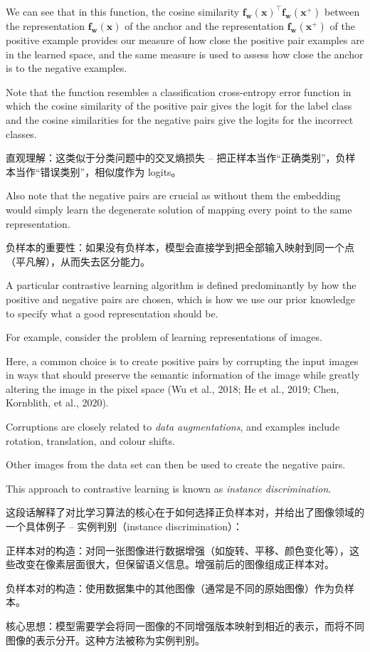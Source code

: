 \documentclass{article}
\begin{document}
We can see that in this function, the cosine similarity $\mathbf{f}_{\mathbf{w}}(\mathbf{x})^\top \mathbf{f}_{\mathbf{w}}(\mathbf{x}^+)$ between the representation $\mathbf{f}_{\mathbf{w}}(\mathbf{x})$ of the anchor and the representation $\mathbf{f}_{\mathbf{w}}(\mathbf{x}^+)$ of the positive example provides our measure of how close the positive pair examples are in the learned space, and the same measure is used to assess how close the anchor is to the negative examples. 

Note that the function resembles a classification cross-entropy error function in which the cosine similarity of the positive pair gives the logit for the label class and the cosine similarities for the negative pairs give the logits for the incorrect classes. 

{\color{red}
直观理解：这类似于分类问题中的交叉熵损失 -- 把正样本当作“正确类别”，负样本当作“错误类别”，相似度作为 logits。
}

Also note that the negative pairs are crucial as without them the embedding would simply learn the degenerate solution of mapping every point to the same representation.

{\color{red}
负样本的重要性：如果没有负样本，模型会直接学到把全部输入映射到同一个点（平凡解），从而失去区分能力。
}

A particular contrastive learning algorithm is defined predominantly by how the positive and negative pairs are chosen, which is how we use our prior knowledge to specify what a good representation should be. 

For example, consider the problem of learning representations of images. 

Here, a common choice is to create positive pairs by corrupting the input images in ways that should preserve the semantic information of the image while greatly altering the image in the pixel space (Wu et al., 2018; He et al., 2019; Chen, Kornblith, et al., 2020). 

Corruptions are closely related to \emph{data augmentations}, and examples include rotation, translation, and colour shifts. 

Other images from the data set can then be used to create the negative pairs. 

This approach to contrastive learning is known as \emph{instance discrimination}.

{\color{red}
这段话解释了对比学习算法的核心在于如何选择正负样本对，并给出了图像领域的一个具体例子 -- 实例判别（instance discrimination）：

正样本对的构造：对同一张图像进行数据增强（如旋转、平移、颜色变化等），这些改变在像素层面很大，但保留语义信息。增强前后的图像组成正样本对。

负样本对的构造：使用数据集中的其他图像（通常是不同的原始图像）作为负样本。

核心思想：模型需要学会将同一图像的不同增强版本映射到相近的表示，而将不同图像的表示分开。这种方法被称为实例判别。

}
\end{document}
